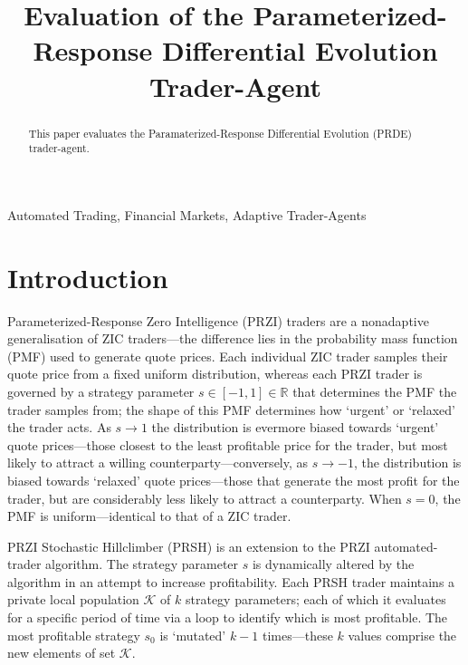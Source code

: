 \documentclass[conference]{IEEEtran}
\begin{document}
\title{Evaluation of the Parameterized-Response Differential Evolution Trader-Agent}

\author{
}

\maketitle

\begin{abstract}
This paper evaluates the Paramaterized-Response Differential Evolution (PRDE) trader-agent.
\end{abstract}

\begin{IEEEkeywords}
Automated Trading, Financial Markets, Adaptive Trader-Agents
\end{IEEEkeywords}

\section{Introduction}

Parameterized-Response Zero Intelligence (PRZI) traders \cite{CliffMetapopulation} are a nonadaptive generalisation of ZIC \cite{GodeSunder} traders---the difference lies in the probability mass function (PMF) used to generate quote prices.
Each individual ZIC trader samples their quote price from a fixed uniform distribution, whereas each PRZI trader is governed by a strategy parameter $s\in[-1, 1]\in\mathbb{R}$ that determines the PMF the trader samples from; the shape of this PMF determines how `urgent' or `relaxed' the trader acts.
As $s\to1$ the distribution is evermore biased towards `urgent' quote prices---those closest to the least profitable price for the trader, but most likely to attract a willing counterparty---conversely, as $s\to-1$, the distribution is biased towards `relaxed' quote prices---those that generate the most profit for the trader, but are considerably less likely to attract a counterparty.
When $s=0$, the PMF is uniform---identical to that of a ZIC trader.

PRZI Stochastic Hillclimber (PRSH) \cite{CliffMetapopulation} is an extension to the PRZI automated-trader algorithm.
The strategy parameter $s$ is dynamically altered by the algorithm in an attempt to increase profitability.
Each PRSH trader maintains a private local population $\mathcal{K}$ of $k$ strategy parameters; each of which it evaluates for a specific period of time via a loop to identify which is most profitable.
The most profitable strategy $s_0$ is `mutated' $k-1$ times---these $k$ values comprise the new elements of set $\mathcal{K}$.
\end{document}
